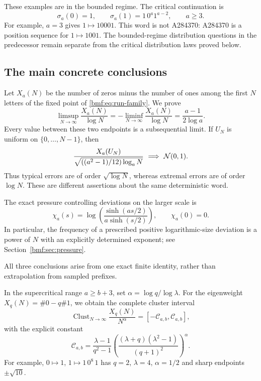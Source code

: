 \documentclass[11pt]{article}
\numberwithin{equation}{section}
\theoremstyle{definition}
\theoremstyle{remark}
\begin{document}
These examples are in the bounded regime. The critical continuation is
\begin{equation}\label{bmf:eq:run-family}
 \sigma_a(0)=1,\qquad \sigma_a(1)=1\,0^a1^{a-2},\qquad a\geq3.
\end{equation}
For example, $a=3$ gives $1\mapsto10001$. This word is not A284370:
A284370 is a position sequence for $1\mapsto1001$.
The bounded-regime distribution questions in the predecessor remain
separate from the critical distribution laws proved below.

\subsection{The main concrete conclusions}

Let $X_a(N)$ be the number of zeros minus the number of ones among
the first $N$ letters of the fixed point of \eqref{bmf:eq:run-family}.
We prove
\begin{equation}\label{bmf:eq:intro-extremes}
 \limsup_{N\to\infty}\frac{X_a(N)}{\log N}
 =-\liminf_{N\to\infty}\frac{X_a(N)}{\log N}
 =\frac{a-1}{2\log a}.
\end{equation}
Every value between these two endpoints is a subsequential limit.
If $U_N$ is uniform on $\{0,\ldots,N-1\}$, then
\begin{equation}\label{bmf:eq:intro-clt}
 \frac{X_a(U_N)}
 {\sqrt{((a^2-1)/12)\log_a N}}
 \ \Longrightarrow\ {\cal N}(0,1).
\end{equation}
Thus typical errors are of order $\sqrt{\log N}$, whereas extremal
errors are of order $\log N$. These are different assertions about
the same deterministic word.

The exact pressure controlling deviations on the larger scale is
\begin{equation}\label{bmf:eq:intro-pressure}
 \chi_a(s)=
 \log\!\left(\frac{\sinh(as/2)}{a\sinh(s/2)}\right),
 \qquad \chi_a(0)=0.
\end{equation}
In particular, the frequency of a prescribed positive
logarithmic-size deviation is a power of $N$ with an explicitly
determined exponent; see Section~\ref{bmf:sec:pressure}.

All three conclusions arise from one exact finite identity, rather
than extrapolation from sampled prefixes.

In the supercritical range $a\geq b+3$, set
$\alpha=\log q/\log\lambda$. For the eigenweight
$X_q(N)=\#0-q\#1$, we obtain the complete cluster interval
\[
 \operatorname{Clust}_{N\to\infty}\frac{X_q(N)}{N^\alpha}
 =[-\mathcal C_{a,b},\mathcal C_{a,b}],
\]
with the explicit constant
\begin{equation}\label{bmf:eq:intro-superconstant}
 \mathcal C_{a,b}=
 \frac{\lambda-1}{q^2-1}
 \left(\frac{(\lambda+q)(\lambda^2-1)}{(q+1)^2}\right)^\alpha.
\end{equation}
For example, $0\mapsto1$, $1\mapsto1\,0^8\,1$ has
$q=2$, $\lambda=4$, $\alpha=1/2$ and sharp endpoints
$\pm\sqrt{10}$.
\end{document}

